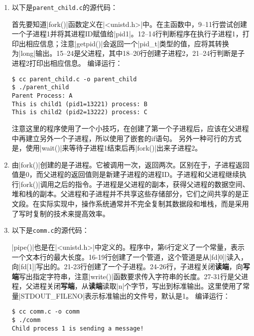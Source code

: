 \documentclass[cs4size,a4paper,nofonts]{ctexart}
\begin{document}
\begin{enumerate}

\item 以下是{\tt parent\_child.c}的源代码：



首先要知道|fork()|函数定义在|<unistd.h>|中。在主函数中，9--11行尝试创建一个子进程1并将其进程ID赋值给|pid1|。12--14行判断程序在执行子进程1，打印出相应信息；注意|getpid()|会返回一个|pid_t|类型的值，应将其转换为|long|输出。15--24是父进程，其中18--20行创建子进程2，21--24行判断是子进程2打印出相应信息。
编译运行：

\begin{Verbatim}
$ cc parent_child.c -o parent_child
$ ./parent_child
Parent Process: A
This is child1 (pid1=13221) process: B
This is child2 (pid2=13222) process: C
\end{Verbatim}

注意这里的程序使用了一个小技巧，在创建了第一个子进程后，应该在父进程中再建立另外一个子进程，所以使用了嵌套的if语句。
另外一种可行的方式是，使用|wait()|来等待子进程1结束后再|fork()|出来子进程2。

\item 由|fork()|创建的是子进程。它被调用一次，返回两次。区别在于，子进程返回值是0，而父进程的返回值则是新建子进程的进程ID。子进程和父进程继续执行|fork()|调用之后的指令。子进程是父进程的副本，获得父进程的数据空间、堆和栈的副本。父进程和子进程并不共享这些存储部分，它们之间共享的是正文段。在实际实现中，操作系统通常并不完全复制其数据段和堆栈，而是采用了写时复制的技术来提高效率。

\item 以下是{\tt comm.c}的源代码：



|pipe()|也是在|<unistd.h>|中定义的。程序中，第6行定义了一个常量，表示一个文本行的最大长度。16-19行创建了一个管道，这个管道是从|fd[0]|读入，向|fd[1]|写出的。21-23行创建了一个子进程。24-26行，子进程关闭{\bf 读端}，向{\bf 写端}写出指定字符串，注意|write()|函数要求传入字符串的长度。27-31行是父进程，父进程关闭{\bf 写端}，从{\bf 读端}读取|n|个字节，写出到标准输出。这里使用了常量|STDOUT_FILENO|表示标准输出的文件号，默认是1。
编译运行：

\begin{Verbatim}
$ cc comm.c -o comm
$ ./comm
Child process 1 is sending a message!
\end{Verbatim}


\end{enumerate}
\end{document}
